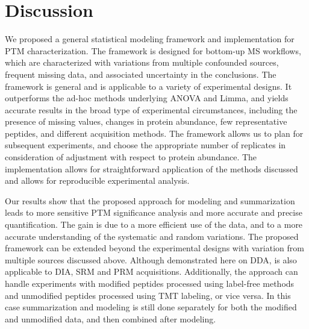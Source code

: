 \documentclass[mcp]{article}
\numberwithin{table}{section}
\begin{document}

\section{Discussion}

We proposed a general statistical modeling framework and implementation for PTM characterization. The framework is designed for bottom-up MS workflows, which are characterized with variations from multiple confounded sources, frequent missing data, and associated uncertainty in the conclusions. The framework is general and is applicable to a variety of experimental designs. It outperforms the ad-hoc methods underlying ANOVA and Limma, and yields accurate results in the broad type of experimental circumstances, including the presence of missing values, changes in protein abundance, few representative peptides, and different acquisition methods. The framework allows us to plan for subsequent experiments, and choose the appropriate number of replicates in consideration of adjustment with respect to protein abundance. The implementation allows for straightforward application of the methods discussed and allows for reproducible experimental analysis.

Our results show that the proposed approach for modeling and summarization leads to more sensitive PTM significance analysis and more accurate and precise quantification. The gain is due to a more efficient use of the data, and to a more accurate understanding of the systematic and random variations. The proposed framework can be extended beyond the experimental designs with variation from multiple sources discussed above. Although demonstrated here on DDA, is also applicable to DIA, SRM and PRM acquisitions. Additionally, the approach can handle experiments with modified peptides processed using label-free methods and unmodified peptides processed using TMT labeling, or vice versa. In this case summarization and modeling is still done separately for both the modified and unmodified data, and then combined after modeling.
\end{document}
